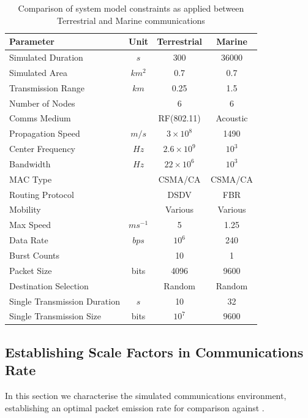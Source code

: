 \documentclass[runningheads,a4paper]{llncs}
\begin{document}
\begin{table}[H]
  \caption{Comparison of system model constraints as applied between Terrestrial and Marine communications} \label{tab:sysconstraints}
  \begin{center}
    \setlength{\tabcolsep}{8pt}
    \begin{tabular}{|l|c|c|c|}
      \hline
      Parameter & Unit & Terrestrial & Marine \\
      \hline
      Simulated Duration & $s$ & 300 & 36000\\
      Simulated Area & $km^2$ & 0.7 & 0.7 \\
      Transmission Range & $km$ & 0.25 & 1.5 \\
      Number of Nodes & & 6 & 6 \\
      Comms Medium & & RF(802.11) & Acoustic\\
      Propagation Speed& $m/s$ & $3\times10^8$ & 1490\\
      Center Frequency& $Hz$ & $2.6\times10^9$ & $10^3$ \\
      Bandwidth& $Hz$ & $22\times10^6$ & $10^3$\\
      MAC Type & & CSMA/CA & CSMA/CA\\
      Routing Protocol & & DSDV & FBR \\
      Mobility & & Various & Various \\
      Max Speed & $ms^{-1}$ & 5 & 1.25 \\
      Data Rate & $bps$ & $10^6$ & 240 \\
      Burst Counts & & 10 & 1 \\
      Packet Size & bits & 4096 & 9600 \\
      Destination Selection & & Random & Random\\
      Single Transmission Duration & $s$ & 10 & 32 \\
      Single Transmission Size & bits & $10^7$ & $9600$ \\
      \hline
    \end{tabular}
    \setlength{\tabcolsep}{6pt}
  \end{center}
\end{table}


\subsection{Establishing Scale Factors in Communications Rate}

In this section we characterise the simulated communications environment, establishing an optimal packet emission rate for comparison against \cite{Guo11}. 
\end{document}
